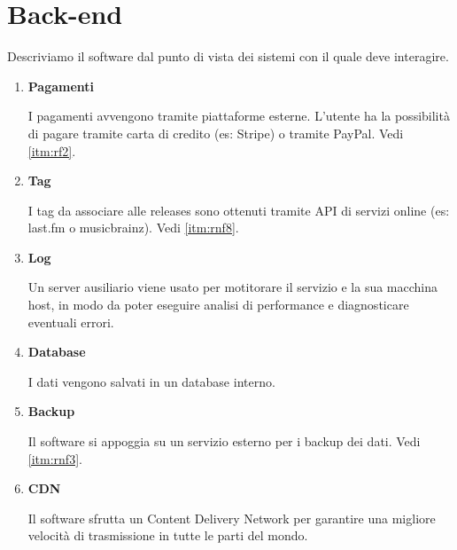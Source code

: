 \documentclass[a4paper,12pt]{article}
\begin{document}
\section{Back-end}

Descriviamo il software dal punto di vista dei sistemi con il quale deve interagire.

\begin{enumerate}[label=\textbf{BE\arabic*}\;, ref=\textbf{BE\arabic*}]
    \item \label{itm:be1} \textbf{Pagamenti}
    
    I pagamenti avvengono tramite piattaforme esterne. L'utente ha la possibilità di pagare tramite carta di credito (es: Stripe) o tramite PayPal. Vedi \ref{itm:rf2}.
    \item \label{itm:be2} \textbf{Tag}
    
    I tag da associare alle releases sono ottenuti tramite API di servizi online (es: last.fm o musicbrainz). Vedi \ref{itm:rnf8}.
    \item \label{itm:be3} \textbf{Log}
    
    Un server ausiliario viene usato per motitorare il servizio e la sua macchina host, in modo da poter eseguire analisi di performance e diagnosticare eventuali errori.
    \item \label{itm:be4} \textbf{Database}
    
    I dati vengono salvati in un database interno.
    \item \label{itm:be5} \textbf{Backup}
    
    Il software si appoggia su un servizio esterno per i backup dei dati. Vedi \ref{itm:rnf3}.
    \item \label{itm:be6} \textbf{CDN}
    
    Il software sfrutta un Content Delivery Network per garantire una migliore velocità di trasmissione in tutte le parti del mondo.
\end{enumerate}
\end{document}
